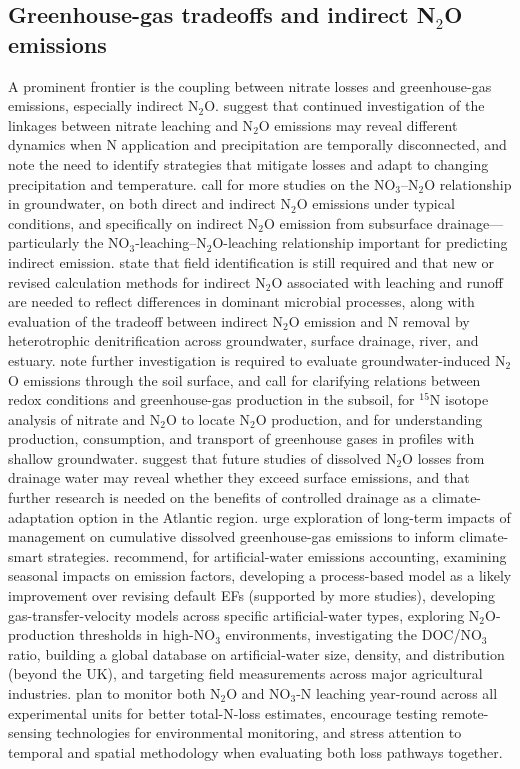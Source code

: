 \subsection{Greenhouse-gas tradeoffs and indirect N$_2$O emissions}
A prominent frontier is the coupling between nitrate losses and greenhouse-gas emissions, especially indirect N$_2$O. \textcite{OBrien2022} suggest that continued investigation of the linkages between nitrate leaching and N$_2$O emissions may reveal different dynamics when N application and precipitation are temporally disconnected, and note the need to identify strategies that mitigate losses and adapt to changing precipitation and temperature. \textcite{Sawamoto2003} call for more studies on the NO$_3$--N$_2$O relationship in groundwater, on both direct and indirect N$_2$O emissions under typical conditions, and specifically on indirect N$_2$O emission from subsurface drainage---particularly the NO$_3$-leaching--N$_2$O-leaching relationship important for predicting indirect emission. \textcite{Minamikawa2015} state that field identification is still required and that new or revised calculation methods for indirect N$_2$O associated with leaching and runoff are needed to reflect differences in dominant microbial processes, along with evaluation of the tradeoff between indirect N$_2$O emission and N removal by heterotrophic denitrification across groundwater, surface drainage, river, and estuary. \textcite{Minamikawa2013} note further investigation is required to evaluate groundwater-induced N$_2$O emissions through the soil surface, and \textcite{Minamikawa2010} call for clarifying relations between redox conditions and greenhouse-gas production in the subsoil, for $^{15}$N isotope analysis of nitrate and N$_2$O to locate N$_2$O production, and for understanding production, consumption, and transport of greenhouse gases in profiles with shallow groundwater. \textcite{Smith2019} suggest that future studies of dissolved N$_2$O losses from drainage water may reveal whether they exceed surface emissions, and that further research is needed on the benefits of controlled drainage as a climate-adaptation option in the Atlantic region. \textcite{Oliveira2025} urge exploration of long-term impacts of management on cumulative dissolved greenhouse-gas emissions to inform climate-smart strategies. \textcite{Webb2021} recommend, for artificial-water emissions accounting, examining seasonal impacts on emission factors, developing a process-based model as a likely improvement over revising default EFs (supported by more studies), developing gas-transfer-velocity models across specific artificial-water types, exploring N$_2$O-production thresholds in high-NO$_3$ environments, investigating the DOC/NO$_3$ ratio, building a global database on artificial-water size, density, and distribution (beyond the UK), and targeting field measurements across major agricultural industries. \textcite{Fontes2019} plan to monitor both N$_2$O and NO$_3$-N leaching year-round across all experimental units for better total-N-loss estimates, encourage testing remote-sensing technologies for environmental monitoring, and stress attention to temporal and spatial methodology when evaluating both loss pathways together.

